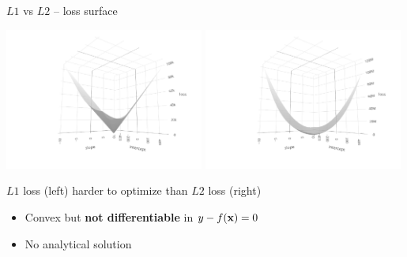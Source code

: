 \documentclass[11pt,compress,t,notes=noshow, xcolor=table]{beamer}
\begin{document}
\begin{vbframe}{$L1$ vs $L2$ -- loss surface}

\includegraphics[width=0.49\textwidth, trim=100 30 100 0, clip]{
figure/reg_l1_surface_abs.pdf}
\includegraphics[width=0.49\textwidth, trim=100 30 100 0, clip]{
figure/reg_l1_surface_quad.pdf}
\vfill

$L1$ loss (left) harder to optimize than $L2$ loss (right)
\begin{itemize}
    \item Convex but \textbf{not differentiable} in
    $y - f(\mathbf{x}) = 0$
    \item No analytical solution
\end{itemize}

\end{vbframe}

\end{document}
